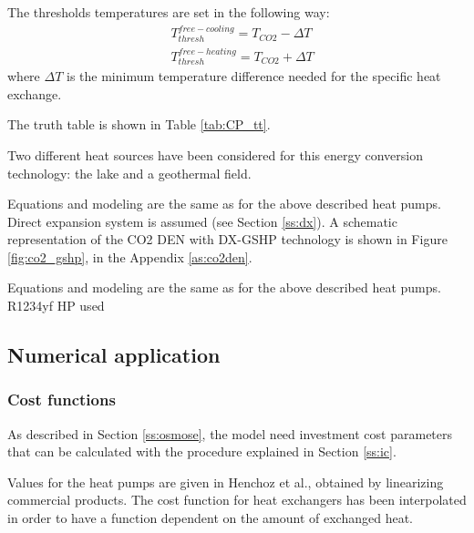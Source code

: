 \documentclass{article}
\begin{document}
The thresholds temperatures are set in the following way:
\begin{align}
& T_{thresh}^{free-cooling} = T_{CO2} - \Delta T \\
& T_{thresh}^{free-heating} = T_{CO2} + \Delta T 
\end{align}
where $\Delta T$ is the minimum temperature difference needed for the specific heat exchange.

The truth table is shown in Table \ref{tab:CP_tt}.



Two different heat sources have been considered for this energy conversion technology: the lake and a geothermal field.

Equations and modeling are the same as for the above described heat pumps. Direct expansion system is assumed (see Section \ref{ss:dx}).
A schematic representation of the CO2 DEN with DX-GSHP technology is shown in Figure \ref{fig:co2_gshp}, in the Appendix \ref{as:co2den}.

Equations and modeling are the same as for the above described heat pumps. R1234yf HP used


%


\subsection{Numerical application}

\subsubsection{Cost functions}

As described in Section \ref{ss:osmose}, the model need investment cost parameters that can be calculated with the procedure explained in Section \ref{ss:ic}.

Values for the heat pumps are given in Henchoz et al., obtained by linearizing commercial products\cite{henchozPerformanceProfitabilityPerspectives2015}. The cost function for heat exchangers has been interpolated in order to have a function dependent on the amount of exchanged heat.
\end{document}
